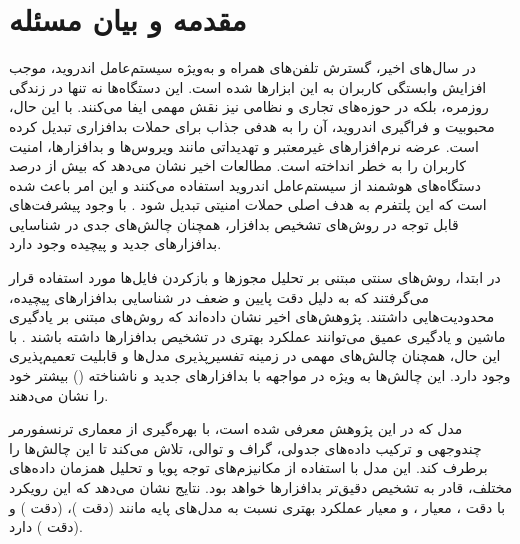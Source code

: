 \section{مقدمه و بیان مسئله}\label{intro}
در سال‌های اخیر، گسترش تلفن‌های همراه و به‌ویژه سیستم‌عامل اندروید، موجب افزایش وابستگی کاربران به این ابزارها شده است. این دستگاه‌ها نه تنها در زندگی روزمره، بلکه در حوزه‌های تجاری و نظامی نیز نقش مهمی ایفا می‌کنند. با این حال، محبوبیت و فراگیری اندروید، آن را به هدفی جذاب برای حملات بدافزاری تبدیل کرده است. عرضه نرم‌افزارهای غیرمعتبر و تهدیداتی مانند ویروس‌ها و بدافزارها، امنیت کاربران را به خطر انداخته است. مطالعات اخیر نشان می‌دهد که بیش از  درصد دستگاه‌های هوشمند از سیستم‌عامل اندروید استفاده می‌کنند و این امر باعث شده است که این پلتفرم به هدف اصلی حملات امنیتی تبدیل شود \cite{AndroidSecurity}. با وجود پیشرفت‌های قابل توجه در روش‌های تشخیص بدافزار، همچنان چالش‌های جدی در شناسایی بدافزارهای جدید و پیچیده وجود دارد.

در ابتدا، روش‌های سنتی مبتنی بر تحلیل مجوزها و بازکردن فایل‌ها مورد استفاده قرار می‌گرفتند که به دلیل دقت پایین و ضعف در شناسایی بدافزارهای پیچیده، محدودیت‌هایی داشتند. پژوهش‌های اخیر نشان داده‌اند که روش‌های مبتنی بر یادگیری ماشین و یادگیری عمیق می‌توانند عملکرد بهتری در تشخیص بدافزارها داشته باشند \cite{DeepLearningMalware}. با این حال، همچنان چالش‌های مهمی در زمینه تفسیرپذیری مدل‌ها و قابلیت تعمیم‌پذیری وجود دارد. این چالش‌ها به ویژه در مواجهه با بدافزارهای جدید و ناشناخته () بیشتر خود را نشان می‌دهند.

مدل  که در این پژوهش معرفی شده است، با بهره‌گیری از معماری ترنسفورمر چندوجهی و ترکیب داده‌های جدولی، گراف و توالی، تلاش می‌کند تا این چالش‌ها را برطرف کند. این مدل با استفاده از مکانیزم‌های توجه پویا و تحلیل همزمان داده‌های مختلف، قادر به تشخیص دقیق‌تر بدافزارها خواهد بود. نتایج نشان می‌دهد که این رویکرد با دقت ، معیار ، و معیار  عملکرد بهتری نسبت به مدل‌های پایه مانند  (دقت )،  (دقت ) و  (دقت ) دارد.

